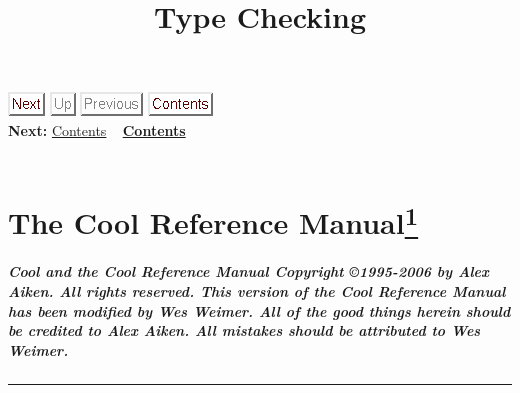 \documentclass[]{article}
\title{Type Checking}
\author{}
\date{}
\begin{document}
\maketitle

\href{node1.html}{\includegraphics{next.png}} \includegraphics{up_g.png}
\includegraphics{prev_g.png}
\href{node1.html}{\includegraphics{contents.png}} \\ \textbf{Next:}
\href{node1.html}{Contents} ~ \textbf{\href{node1.html}{Contents}} \\ \\

\section{The Cool Reference
Manual\href{footnode.html\#foot266}{\textsuperscript{1}}}

\subparagraph{Cool and the Cool Reference Manual Copyright ©1995-2006 by
Alex Aiken. All rights reserved. This version of the Cool Reference
Manual has been modified by Wes Weimer. All of the good things herein
should be credited to Alex Aiken. All mistakes should be attributed to
Wes Weimer.}

\begin{center}\rule{3in}{0.4pt}\end{center}
\end{document}
